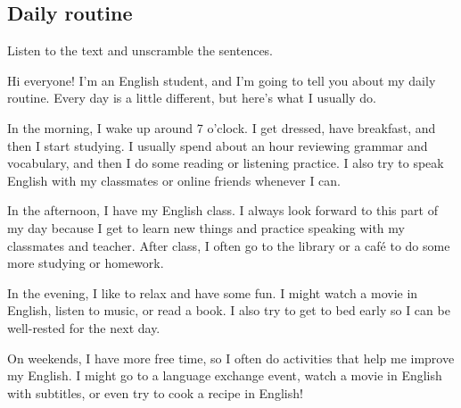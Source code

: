 \documentclass[]{article} %
\begin{document}
\iffalse 
The speaker wakes up at eight o'clock in the morning.
2
The speaker usually has avocado toast and a coffee with milk for breakfast.
3
The speaker starts working at half-past nine and finishes working at 2:00 p.m.
4
The speaker usually goes to the cafeteria for lunch or an Italian restaurant for pizza.
5
The speaker is currently earning a master's degree in English studies.
6
After classes, the speaker either goes to the gym or goes out with friends.
7
The speaker falls asleep at midnight.
\fi 


\subsection*{Daily routine}
Listen to the text and unscramble the sentences. 

\iffalse 
Hi everyone! I'm an English student, and I'm going to tell you about my daily routine. Every day is a little different, but here's what I usually do.

In the morning, I wake up around 7 o'clock. I get dressed, have breakfast, and then I start studying. I usually spend about an hour reviewing grammar and vocabulary, and then I do some reading or listening practice. I also try to speak English with my classmates or online friends whenever I can.

In the afternoon, I have my English class. I always look forward to this part of my day because I get to learn new things and practice speaking with my classmates and teacher. After class, I often go to the library or a café to do some more studying or homework.

In the evening, I like to relax and have some fun. I might watch a movie in English, listen to music, or read a book. I also try to get to bed early so I can be well-rested for the next day.

On weekends, I have more free time, so I often do activities that help me improve my English. I might go to a language exchange event, watch a movie in English with subtitles, or even try to cook a recipe in English!
\end{document}

